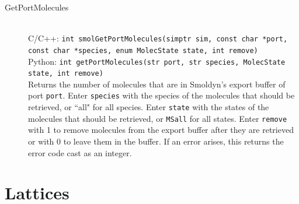 \documentclass {book}
\newcommand {\ttt} {\texttt}
\begin{document}
\begin{description}
\item[GetPortMolecules]
\hfill \\
C/C++: \ttt{int smolGetPortMolecules(simptr sim, const char *port, const char *species, enum MolecState state, int remove)}\\
Python: \ttt{int getPortMolecules(str port, str species, MolecState state, int remove)}\\
Returns the number of molecules that are in Smoldyn's export buffer of port \ttt{port}. Enter \ttt{species} with the species of the molecules that should be retrieved, or ``all" for all species. Enter \ttt{state} with the states of the molecules that should be retrieved, or \ttt{MSall} for all states. Enter \ttt{remove} with 1 to remove molecules from the export buffer after they are retrieved or with 0 to leave them in the buffer. If an error arises, this returns the error code cast as an integer.

\end{description}


\section{Lattices}
\end{document}
